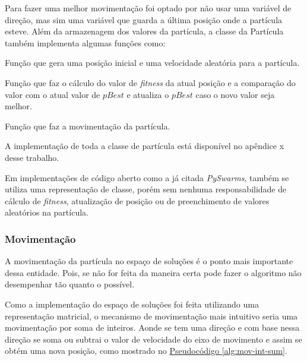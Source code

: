             Para fazer uma melhor movimentação foi optado por não usar uma variável de direção, mas sim uma variável que guarda a última posição onde a partícula esteve.\newline
            Além da armazenagem dos valores da partícula, a classe da Partícula também implementa algumas funções como:\newline
            
            Função \textbf{} que gera uma posição inicial e uma velocidade aleatória para a partícula.\newline
            
            Função \textbf{} que faz o cálculo do valor de \textit{fitness} da atual posição e a comparação do valor com o atual valor de $pBest$ e atualiza o $pBest$ caso o novo valor seja melhor.\newline

            Função \textbf{} que faz a movimentação da partícula.\newline
            

            \noindent A implementação de toda a classe de partícula está disponível no apêndice x desse trabalho.\newline

            
            
            Em implementações de código aberto como a já citada \textit{PySwarms}, também se utiliza uma representação de classe, porém sem nenhuma responsabilidade de cálculo de \textit{fitness}, atualização de posição ou de preenchimento de valores aleatórios na partícula.\newline


        \subsubsection{Movimentação}
            A movimentação da partícula no espaço de soluções é o ponto mais importante dessa entidade. Pois, se não for feita da maneira certa pode fazer o algoritmo não desempenhar tão quanto o possível.\newline
            
            Como a implementação do espaço de soluções foi feita utilizando uma representação matricial, o mecanismo de movimentação mais intuitivo seria uma movimentação por soma de inteiros.\newline
            Aonde se tem uma direção e com base nessa direção se soma ou subtrai o valor de velocidade do eixo de movimento e assim se obtém uma nova posição, como mostrado no 
            \hyperref[alg:mov-int-sum]{Pseudocódigo \ref{alg:mov-int-sum}}.\newline

